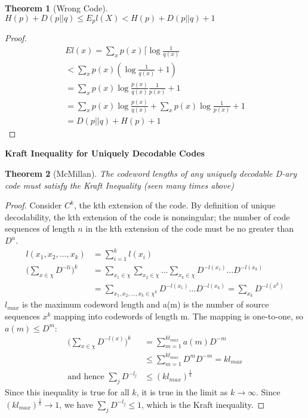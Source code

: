 \documentclass[10pt]{article}
\newtheorem{thm}{Theorem}[section]
\begin{document}
\begin{tiny}
\begin{multicols}{3}
\begin{thm}[Wrong Code]
$H(p)+D(p||q) \leq E_pl(X)<H(p)+D(p||q)+1$
\end{thm}
\begin{proof}
    \begin{eqnarray}
El(x) = \sum_x p(x) \lceil\log \frac{1}{q(x)} \\
< \sum_x p(x) (\log \frac{1}{q(x)} + 1) \\
= \sum_x p(x) \log \frac{p(x)}{q(x)} \frac{1}{p(x)} + 1 \\
= \sum_x p(x) \log \frac{p(x)}{q(x)} + \sum_x p(x) \log \frac{1}{p(x)} + 1 \\
= D(p||q) + H(p) + 1
\end{eqnarray}
\end{proof}




\textbf{\scriptsize Kraft Inequality for Uniquely Decodable Codes}
\begin{thm}[McMillan] \label{thm: mcmillan}
The codeword lengths of any uniquely decodable D-ary code must satisfy the Kraft Inequality (seen many times above) 
\end{thm}
\begin{proof}
Consider ${C^{k}}$, the kth extension of the code. By definition of unique decodability, the kth extension of the code is nonsingular; 
the number of code sequences of length ${n}$ in the kth extension of the code must be no greater than ${D^{n}}$. 
\begin{align}
l({x_1},{x_2}, \ldots , {x_k}) &= \sum_{i=1}^{k} l({x_i})\\
\bigg(\sum_{x\in \chi} D^{-li}\bigg)^{k} &=
\sum_{x_1\in\chi}\sum_{x_2\in\chi} \ldots \sum_{x_k\in\chi}  D^{-l({x_1})} \ldots D^{-l({x_k})}\\
&=\sum_{{x_1},{x_2}, \ldots , {x_k} \in \chi^{k}}  D^{-l({x_1})}\ldots D^{-l({x_k})} 
=\sum_{x_k} D^{-l({x^{k}})}
\end{align}
${l_{max}}$ is the maximum codeword length and a(m) is the number of source sequences
${x^{k}}$ mapping into codewords of length m. The mapping is one-to-one, so $a(m) \leq D^{m}$:
\begin{align}
\bigg(\sum_{x\in\chi} D^{-l(x)}\bigg)^{k} &= \sum_{m=1}^{kl_{max}} a(m)D^{-m}\\
&\leq \sum_{m=1}^{kl_{max}} D^{m}D^{-m} = kl_{max}\\
\text{and hence } \sum_j D^{-l_j} &\leq (kl_{max})^{\frac{1}{k}}
\end{align}
Since this inequality is true for all ${k}$, it is true in the limit as ${k} \rightarrow \infty$.
Since ${(kl_{max})^{\frac{1}{k}}} \rightarrow 1$, we have 
$\sum_j D^{-l_j} \leq 1$, which is the Kraft inequality.
\end{proof}


\end{multicols}
\end{tiny}
\end{document}
